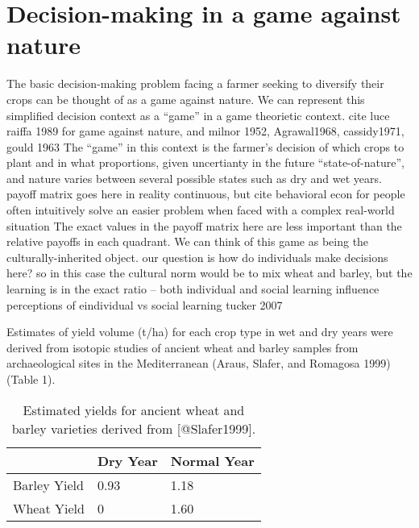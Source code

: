 \documentclass[smallextended]{svjour3}       %
\begin{document}
\hypertarget{sec:1}{%
\section{Decision-making in a game against nature}\label{sec:1}}

The basic decision-making problem facing a farmer seeking to diversify
their crops can be thought of as a game against nature. We can represent
this simplified decision context as a ``game'' in a game theorietic
context. cite luce raiffa 1989 for game against nature, and milnor 1952,
Agrawal1968, cassidy1971, gould 1963 The ``game'' in this context is the
farmer's decision of which crops to plant and in what proportions, given
uncertianty in the future ``state-of-nature'', and nature varies between
several possible states such as dry and wet years. payoff matrix goes
here in reality continuous, but cite behavioral econ for people often
intuitively solve an easier problem when faced with a complex real-world
situation The exact values in the payoff matrix here are less important
than the relative payoffs in each quadrant. We can think of this game as
being the culturally-inherited object. our question is how do
individuals make decisions here? so in this case the cultural norm would
be to mix wheat and barley, but the learning is in the exact ratio --
both individual and social learning influence perceptions of eindividual
vs social learning tucker 2007

Estimates of yield volume (t/ha) for each crop type in wet and dry years
were derived from isotopic studies of ancient wheat and barley samples
from archaeological sites in the Mediterranean (Araus, Slafer, and
Romagosa 1999) (Table 1).

\begin{table}
\centering
\caption{Estimated yields for ancient wheat and barley varieties derived from [@Slafer1999].}
\begin{tabular}{|l|l|l|}
\hline

 & Dry Year & Normal Year \\ \hline
Barley Yield & 0.93 & 1.18 \\ \hline
Wheat Yield & 0 & 1.60 \\ \hline

\end{tabular}
\end{table}
\end{document}
